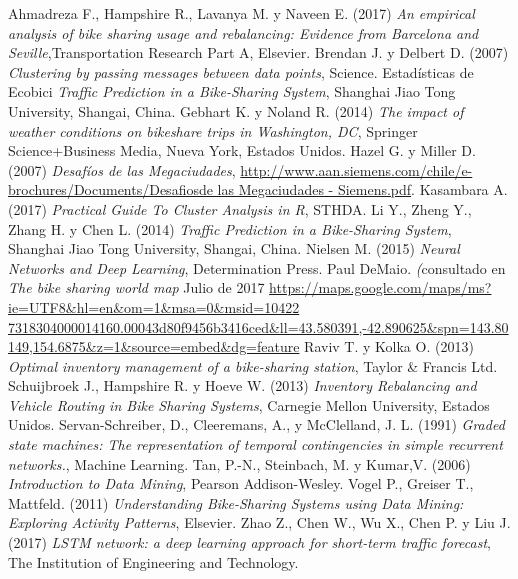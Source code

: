 \documentclass[12pt,spanish]{article}
\begin{document}
	\begin{thebibliography}{9}
		 Ahmadreza F., Hampshire R., Lavanya M. y Naveen E. (2017) \textit{An empirical analysis of bike sharing usage and rebalancing: Evidence from Barcelona and Seville},Transportation Research Part A, Elsevier.
		 Brendan J. y Delbert D. (2007) \textit{Clustering by passing messages between data points}, Science.
		 Estadísticas de Ecobici \textit{Traffic Prediction in a Bike-Sharing System}, Shanghai Jiao Tong University, Shangai, China.
		 Gebhart K. y Noland R. (2014) \textit{The impact of weather conditions on bikeshare trips in Washington, DC}, Springer Science+Business Media, Nueva York, Estados Unidos.
		 Hazel G. y Miller D. (2007) \textit{Desafíos de las Megaciudades}, \ul{http://www.aan.siemens.com/chile/e-brochures/Documents/Desafiosde las Megaciudades - Siemens.pdf}.
		 Kasambara A. (2017) \textit{Practical Guide To Cluster Analysis in R}, STHDA.
		 Li Y., Zheng Y., Zhang H. y Chen L. (2014) \textit{Traffic Prediction in a Bike-Sharing System}, Shanghai Jiao Tong University, Shangai, China.
		 Nielsen M. (2015) \textit{Neural Networks and Deep Learning}, Determination Press.
		 Paul DeMaio. \textit(consultado en \textit{The bike sharing world map} Julio de 2017 \ul{https://maps.google.com/maps/ms?ie=UTF8\&hl=en\&om=1\&msa=0\&msid=10422 7318304000014160.00043d80f9456b3416ced\&ll=43.580391,-42.890625\&spn=143.80149,154.6875\&z=1\&source=embed\&dg=feature}
		 Raviv T. y Kolka O. (2013) \textit{Optimal inventory management of a bike-sharing station}, Taylor \& Francis Ltd.
		 Schuijbroek J., Hampshire R. y Hoeve W. (2013) \textit{Inventory Rebalancing and Vehicle Routing in Bike	Sharing Systems}, Carnegie Mellon University, Estados Unidos.
		 Servan-Schreiber, D., Cleeremans, A., y McClelland, J. L. (1991) \textit{Graded state machines: The representation of temporal contingencies in simple recurrent networks.}, Machine Learning.
		 Tan, P.-N., Steinbach, M. y Kumar,V. (2006) \textit{Introduction to Data Mining}, Pearson Addison-Wesley.
		 Vogel P., Greiser T., Mattfeld. (2011) \textit{Understanding Bike-Sharing Systems using Data Mining: Exploring Activity Patterns}, Elsevier.
		 Zhao Z., Chen W., Wu X., Chen P. y Liu J. (2017) \textit{LSTM network: a deep learning approach for short-term traffic forecast}, The Institution of Engineering and Technology.

	
	\end{thebibliography}
\end{document}
